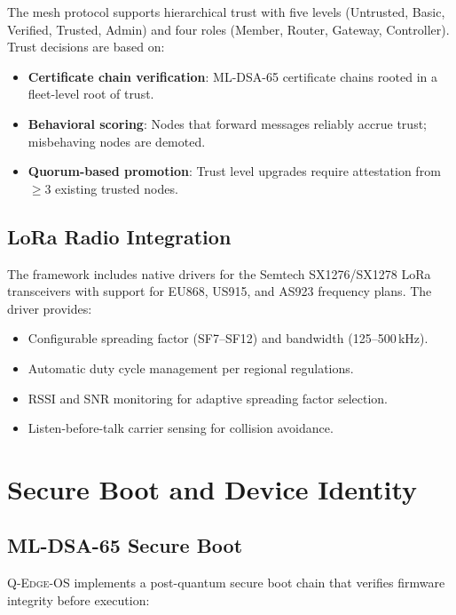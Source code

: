 \documentclass[conference,10pt]{IEEEtran}
\newcommand{\system}{\textsc{Q-Edge-OS}}
\begin{document}
The mesh protocol supports hierarchical trust with five levels (Untrusted, Basic, Verified, Trusted, Admin) and four roles (Member, Router, Gateway, Controller). Trust decisions are based on:

\begin{itemize}[leftmargin=*]
  \item \textbf{Certificate chain verification}: ML-DSA-65 certificate chains rooted in a fleet-level root of trust.
  \item \textbf{Behavioral scoring}: Nodes that forward messages reliably accrue trust; misbehaving nodes are demoted.
  \item \textbf{Quorum-based promotion}: Trust level upgrades require attestation from $\geq$3 existing trusted nodes.
\end{itemize}

\subsection{LoRa Radio Integration}

The framework includes native drivers for the Semtech SX1276/SX1278 LoRa transceivers with support for EU868, US915, and AS923 frequency plans. The driver provides:

\begin{itemize}[leftmargin=*]
  \item Configurable spreading factor (SF7--SF12) and bandwidth (125--500\,kHz).
  \item Automatic duty cycle management per regional regulations.
  \item RSSI and SNR monitoring for adaptive spreading factor selection.
  \item Listen-before-talk carrier sensing for collision avoidance.
\end{itemize}

\section{Secure Boot and Device Identity}
\label{sec:boot}

\subsection{ML-DSA-65 Secure Boot}

\system{} implements a post-quantum secure boot chain that verifies firmware integrity before execution:
\end{document}
